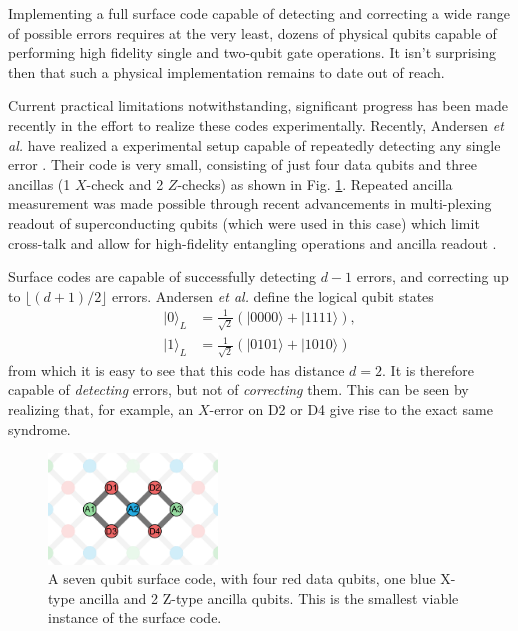 Implementing a full surface code capable of detecting and correcting a wide
range of possible errors requires at the very least, dozens of physical qubits
capable of performing high fidelity single and two-qubit gate operations. It
isn't surprising then that such a physical implementation remains to date out of
reach. 

Current practical limitations notwithstanding, significant progress has been
made recently in the effort to realize these codes experimentally. Recently,
Andersen \textit{et al.} have realized a experimental setup capable of
repeatedly detecting any single error \cite{Andersen_2020}. Their code is very
small, consisting of just four data qubits and three ancillas (1 $X$-check and 2
$Z$-checks) as shown in Fig. \ref{fig:seven_qbit_code}. Repeated ancilla
measurement was made possible through recent advancements in multi-plexing
readout of superconducting qubits (which were used in this case) which limit
cross-talk and allow for high-fidelity entangling operations and ancilla readout
\cite{barends14_super_quant_circuit_at_surfac} \cite{Bultink_2020}.

Surface codes are capable of successfully detecting $d-1$ errors, and correcting
up to $\lfloor{(d+1)/2} \rfloor$ errors. Andersen \textit{et al.} define the
logical qubit states
\begin{align}
|0\rangle_L &= \frac{1}{\sqrt{2}} (|0000\rangle + |1111\rangle) , \\
|1\rangle_L &= \frac{1}{\sqrt{2}} (|0101\rangle + |1010\rangle) 
\end{align}
from which it is easy to see that this code has distance $d=2$. It is therefore
capable of \textit{detecting} errors, but not of \textit{correcting} them. This
can be seen by realizing that, for example, an $X$-error on D2 or D4 give rise
to the exact same syndrome.

\begin{figure}
  \centering
  \includegraphics[width=0.4\textwidth]{images/seven_qbit_code.png}
  \caption{A seven qubit surface code, with four red data qubits, one blue
    X-type ancilla and 2 Z-type ancilla qubits. This is the smallest viable
    instance of the surface code.}
  \label{fig:seven_qbit_code}
\end{figure}

